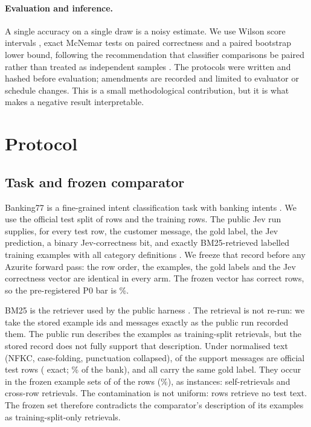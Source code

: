 \documentclass[11pt]{article}
\begin{document}
\paragraph{Evaluation and inference.}
A single accuracy on a single draw is a noisy estimate. We use Wilson score
intervals \citep{wilson1927}, exact McNemar tests on paired correctness
\citep{mcnemar1947} and a paired bootstrap lower bound, following the
recommendation that classifier comparisons be paired rather than treated as
independent samples \citep{dietterich1998}. The protocols were written and
hashed before evaluation; amendments are recorded and limited to evaluator or
schedule changes. This is a small methodological contribution, but it is what
makes a negative result interpretable.

\section{Protocol}
\label{sec:protocol}

\subsection{Task and frozen comparator}

Banking77 is a fine-grained intent classification task with \PLabels{} banking
intents \citep{casanueva2020banking}. We use the official test split of \PN{}
rows and the \PTrainN{} training rows. The public Jev run supplies, for every
test row, the customer message, the gold label, the Jev prediction, a binary
Jev-correctness bit, and exactly \PExamples{} BM25-retrieved labelled training
examples with all \PLabels{} category definitions \citep{smith2026jevbanking}.
We freeze that record before any Azurite forward pass: the row order, the
examples, the gold labels and the Jev correctness vector are identical in every
arm. The frozen vector has \PJevCorrect{} correct rows, so the pre-registered
P0 bar is \PBar\%.

BM25 is the retriever used by the public harness
\citep{robertson2009bm25}. The retrieval is not re-run: we take the stored
example ids and messages exactly as the public run recorded them. The public
run describes the examples as training-split retrievals, but the stored record
does not fully support that description. Under normalised text (NFKC,
case-folding, punctuation collapsed), \PContamSupportMatches{} of the
\PContamSupportRows{} support messages are official test rows
(\PContamSupportExact{} exact; \PContamSupportShare\% of the bank), and all
carry the same gold label. They occur in the frozen example sets of
\PContamEvalRows{} of the \PN{} rows (\PContamEvalShare\%), as
\PContamInstances{} instances: \PContamSelf{} self-retrievals and
\PContamCross{} cross-row retrievals. The contamination is not uniform:
\PUnaffectedN{} rows retrieve no test text. The frozen set therefore contradicts
the comparator's description of its examples as training-split-only retrievals.
\end{document}
